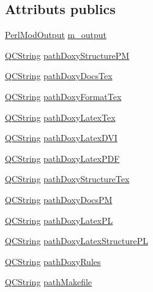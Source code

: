 \subsection*{Attributs publics}
\begin{DoxyCompactItemize}
\item 
\hyperlink{class_perl_mod_output}{Perl\+Mod\+Output} \hyperlink{class_perl_mod_generator_a1570f315b84f678d45d80929fe3af533}{m\+\_\+output}
\item 
\hyperlink{class_q_c_string}{Q\+C\+String} \hyperlink{class_perl_mod_generator_a4139ab7ca413fcf7e9d9c10a6abb13f2}{path\+Doxy\+Structure\+P\+M}
\item 
\hyperlink{class_q_c_string}{Q\+C\+String} \hyperlink{class_perl_mod_generator_a6b90bb007822613373e9a65ff35643c4}{path\+Doxy\+Docs\+Tex}
\item 
\hyperlink{class_q_c_string}{Q\+C\+String} \hyperlink{class_perl_mod_generator_aab3220d2f03ba759c948d8be316d4d2c}{path\+Doxy\+Format\+Tex}
\item 
\hyperlink{class_q_c_string}{Q\+C\+String} \hyperlink{class_perl_mod_generator_ad2ea9cd9b17663a5b3ff62752031fb2b}{path\+Doxy\+Latex\+Tex}
\item 
\hyperlink{class_q_c_string}{Q\+C\+String} \hyperlink{class_perl_mod_generator_a4b29e2e00432a296288342688354b856}{path\+Doxy\+Latex\+D\+V\+I}
\item 
\hyperlink{class_q_c_string}{Q\+C\+String} \hyperlink{class_perl_mod_generator_aab3b623c4824006226ea5195aec1d8ef}{path\+Doxy\+Latex\+P\+D\+F}
\item 
\hyperlink{class_q_c_string}{Q\+C\+String} \hyperlink{class_perl_mod_generator_a240a78f6c0326286469e17febcb3e386}{path\+Doxy\+Structure\+Tex}
\item 
\hyperlink{class_q_c_string}{Q\+C\+String} \hyperlink{class_perl_mod_generator_a32a35dd412f8e42e1f12b671935da576}{path\+Doxy\+Docs\+P\+M}
\item 
\hyperlink{class_q_c_string}{Q\+C\+String} \hyperlink{class_perl_mod_generator_a23cafbc784eadd8d96ea498c07ee1b22}{path\+Doxy\+Latex\+P\+L}
\item 
\hyperlink{class_q_c_string}{Q\+C\+String} \hyperlink{class_perl_mod_generator_a8dd402f31f1312093ec503a733a5c691}{path\+Doxy\+Latex\+Structure\+P\+L}
\item 
\hyperlink{class_q_c_string}{Q\+C\+String} \hyperlink{class_perl_mod_generator_a5b043201cbf4b5840582794d44bdcafb}{path\+Doxy\+Rules}
\item 
\hyperlink{class_q_c_string}{Q\+C\+String} \hyperlink{class_perl_mod_generator_a2a2147107f3c1812beb023cb68a10c55}{path\+Makefile}
\end{DoxyCompactItemize}


